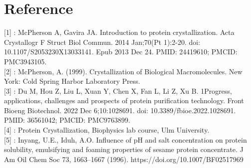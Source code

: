 \documentclass[a4paper,english,12pt,bibliography=totoc]{scrreprt}
\begin{document}
\chapter{Reference}
[1]\label{sec:ref_1} : McPherson A, Gavira JA. Introduction to protein crystallization. Acta Crystallogr F Struct Biol Commun. 2014 Jan;70(Pt 1):2-20. doi: 10.1107/S2053230X13033141. Epub 2013 Dec 24. PMID: 24419610; PMCID: PMC3943105. \\

[2]\label{sec:ref_2} : McPherson, A. (1999). Crystallization of Biological Macromolecules. New York: Cold Spring Harbor Laboratory Press.\\

[3]\label{sec:ref_3} : Du M, Hou Z, Liu L, Xuan Y, Chen X, Fan L, Li Z, Xu B. 1Progress, applications, challenges and prospects of protein purification technology. Front Bioeng Biotechnol. 2022 Dec 6;10:1028691. doi: 10.3389/fbioe.2022.1028691. PMID: 36561042; PMCID: PMC9763899.\\

[4]\label{sec:ref_4} : Protein Crystallization, Biophysics lab course, Ulm University.\\

[5]\label{sec:ref_5} : Inyang, U.E., Iduh, A.O. Influence of pH and salt concentration on protein solubility, emulsifying and foaming properties of sesame protein concentrate. J Am Oil Chem Soc 73, 1663–1667 (1996). https://doi.org/10.1007/BF02517969\\

\end{document}
